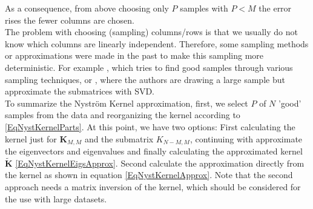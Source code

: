 As a consequence, from above choosing only $P$ samples with $P< M$ the error rises the fewer columns are chosen.\cite{Williams.2000}\\
The problem with choosing (sampling) columns/rows is that we usually do not know which columns are linearly independent.
Therefore, some sampling methods or approximations were made in the past to make this sampling more deterministic.
For example \cite{Kumar.2012}, which tries to find good samples through various sampling techniques, or \cite{Li.2015}, where the authors are drawing a large sample but approximate the submatrices with \ac{SVD}.\\
To summarize the Nyström Kernel approximation, first, we select $P$ of $N$ 'good' samples from the data and reorganizing the kernel according to \eqref{EqNystKernelParts}.
At this point, we have two options:
First calculating the kernel just for $\mathbf{K}_{M, M}$ and the submatrix ${K}_{N-M, M}$, continuing with approximate the eigenvectors and eigenvalues and finally calculating the approximated kernel $\tilde{\mathbf{K}}$ \eqref{EqNystKernelEigsApprox}.
Second calculate the approximation directly from the kernel as shown in equation \eqref{EqNystKernelApprox}. Note that the second approach needs a matrix inversion of the kernel, which should be considered for the use with large datasets.
